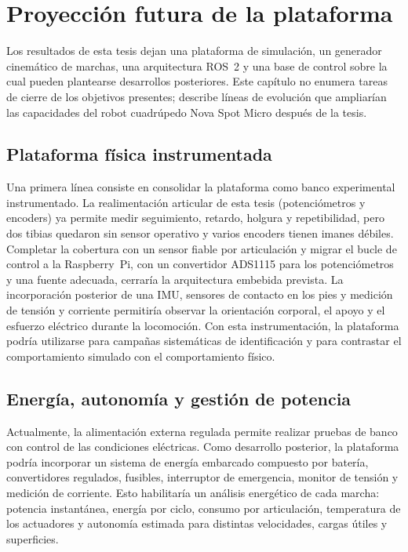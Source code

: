 \chapter{Proyección futura de la plataforma}

Los resultados de esta tesis dejan una plataforma de simulación, un generador
cinemático de marchas, una arquitectura ROS~2 y una base de control sobre la
cual pueden plantearse desarrollos posteriores. Este capítulo no enumera
tareas de cierre de los objetivos presentes; describe líneas de evolución que
ampliarían las capacidades del robot cuadrúpedo Nova Spot Micro después de la
tesis.

\section{Plataforma física instrumentada}

Una primera línea consiste en consolidar la plataforma como banco experimental
instrumentado. La realimentación articular de esta tesis (potenciómetros y
encoders) ya permite medir seguimiento, retardo, holgura y repetibilidad, pero
dos tibias quedaron sin sensor operativo y varios encoders tienen imanes débiles.
Completar la cobertura con un sensor fiable por articulación y migrar el bucle de
control a la Raspberry~Pi, con un convertidor ADS1115 para los potenciómetros y
una fuente adecuada, cerraría la arquitectura embebida prevista. La
incorporación posterior de una IMU, sensores de contacto en los pies y medición
de tensión y corriente permitiría observar la orientación corporal, el apoyo y
el esfuerzo eléctrico durante la locomoción. Con esta instrumentación, la
plataforma podría utilizarse para campañas sistemáticas de identificación y
para contrastar el comportamiento simulado con el comportamiento físico.

\section{Energía, autonomía y gestión de potencia}

Actualmente, la alimentación externa regulada permite realizar pruebas de banco
con control de las condiciones eléctricas. Como desarrollo posterior, la
plataforma podría incorporar un sistema de energía embarcado compuesto por
batería, convertidores regulados, fusibles, interruptor de emergencia, monitor
de tensión y medición de corriente. Esto habilitaría un análisis energético de
cada marcha: potencia instantánea, energía por ciclo, consumo por articulación,
temperatura de los actuadores y autonomía estimada para distintas velocidades,
cargas útiles y superficies.

